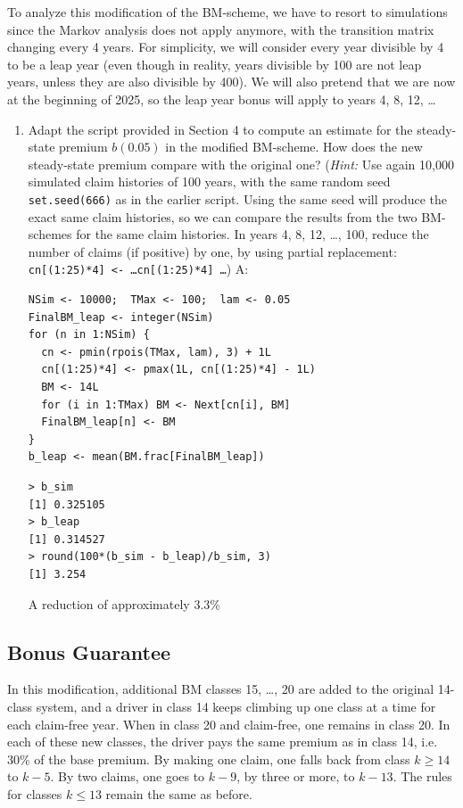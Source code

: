 \documentclass{article}
\begin{document}
To analyze this modification of the BM-scheme, we have to resort to simulations since the Markov analysis does not apply anymore, with the transition matrix changing every 4 years. For simplicity, we will consider every year divisible by 4 to be a leap year (even though in reality, years divisible by 100 are not leap years, unless they are also divisible by 400). We will also pretend that we are now at the beginning of 2025, so the leap year bonus will apply to years 4, 8, 12, \ldots
\clearpage
\begin{enumerate}
  \item [$\boldsymbol{Q}_7$] Adapt the script provided in Section 4 to compute an estimate for the steady-state premium $b(0.05)$ in the modified BM-scheme. How does the new steady-state premium compare with the original one? (\textit{Hint:} Use again 10,000 simulated claim histories of 100 years, with the same random seed \texttt{set.seed(666)} as in the earlier script. Using the same seed will produce the exact same claim histories, so we can compare the results from the two BM-schemes for the same claim histories. In years 4, 8, 12, \ldots, 100, reduce the number of claims (if positive) by one, by using partial replacement: \texttt{cn[(1:25)*4] <- \ldots cn[(1:25)*4] \ldots}) \newline
  A: 
\begin{lstlisting}
NSim <- 10000;  TMax <- 100;  lam <- 0.05
FinalBM_leap <- integer(NSim)
for (n in 1:NSim) {
  cn <- pmin(rpois(TMax, lam), 3) + 1L
  cn[(1:25)*4] <- pmax(1L, cn[(1:25)*4] - 1L)
  BM <- 14L
  for (i in 1:TMax) BM <- Next[cn[i], BM]
  FinalBM_leap[n] <- BM
}
b_leap <- mean(BM.frac[FinalBM_leap])
\end{lstlisting}
\begin{lstlisting}
> b_sim
[1] 0.325105
> b_leap
[1] 0.314527
> round(100*(b_sim - b_leap)/b_sim, 3)
[1] 3.254
\end{lstlisting}
A reduction of approximately $3.3\%$
\end{enumerate}
\clearpage

\subsection{Bonus Guarantee}
 
In this modification, additional BM classes 15, \ldots, 20 are added to the original 14-class system, and a driver in class 14 keeps climbing up one class at a time for each claim-free year. When in class 20 and claim-free, one remains in class 20. In each of these new classes, the driver pays the same premium as in class 14, i.e. 30\% of the base premium. By making one claim, one falls back from class $k \geq 14$ to $k - 5$. By two claims, one goes to $k - 9$, by three or more, to $k - 13$. The rules for classes $k \leq 13$ remain the same as before.
 
\end{document}
